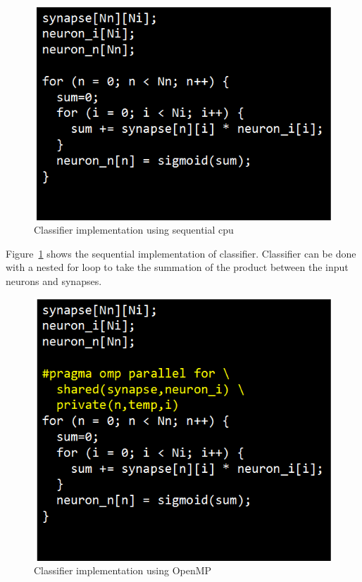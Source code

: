 \begin{figure}
  \begin{center}
    \includegraphics[width=\linewidth]{cs758-figs/classifier-cpu.png}
  \end{center}
\vspace{-0.2in}
  \caption{Classifier implementation using sequential cpu}
  \label{fig:classifier-cpu}
\vspace{-0.05in}
\end{figure}

Figure~\ref{fig:classifier-cpu} shows the sequential implementation of 
classifier. Classifier can be done with a nested for loop to take the 
summation of the product between the input neurons and synapses.


\begin{figure}
  \begin{center}
    \includegraphics[width=\linewidth]{cs758-figs/classifier-omp.png}
  \end{center}
\vspace{-0.2in}
  \caption{Classifier implementation using OpenMP}
  \label{fig:classifier-omp}
\vspace{-0.05in}
\end{figure}

